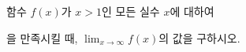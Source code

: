 함수 $f(x)$가 $x>1$인 모든 실수 $x$에 대하여\par\smallskip{}\par\smallskip\noindent 을 만족시킬 때, $\displaystyle\lim_{x\to\infty} f(x)$의 값을 구하시오.
